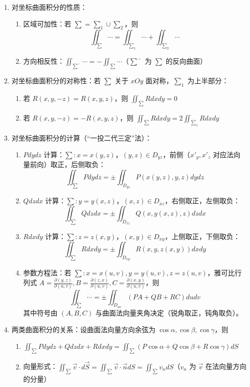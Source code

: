 \documentclass[UTF8]{ctexart}
\theoremstyle{remark}
\begin{document}
\begin{enumerate}
		\item 对坐标曲面积分的性质：
		\begin{enumerate}
			\item 区域可加性：若 \(\sum = \sum_1 \cup \sum_2\)，则 
			\[
			\iint_{\sum} \cdots = \iint_{\sum_1} \cdots + \iint_{\sum_2} \cdots
			\]
			\item 方向相反性：\(\iint_{\sum^-} \cdots = -\iint_{\sum} \cdots\)（\(\sum^-\) 为 \(\sum\) 的反向曲面）
		\end{enumerate}
		
		\item 对坐标曲面积分的对称性：若 \(\sum\) 关于 \(xOy\) 面对称，\(\sum_1\) 为上半部分：
		\begin{enumerate}
			\item 若 \(R(x, y, -z) = R(x, y, z)\)，则 \(\iint_{\sum} R dxdy = 0\)
			\item 若 \(R(x, y, -z) = -R(x, y, z)\)，则 \(\iint_{\sum} R dxdy = 2\iint_{\sum_1} R dxdy\)
		\end{enumerate}
		
		\item 对坐标曲面积分的计算（“一投二代三定”法）：
		\begin{enumerate}
			\item \(P dydz\) 计算：\(\sum: x = x(y, z)\)，\((y, z)\in D_{yz}\)，前侧（\(x'_y, x'_z\) 对应法向量前向）取正，后侧取负：
			\[
			\iint_{\sum} P dydz = \pm\iint_{D_{yz}} P(x(y, z), y, z) dydz
			\]
			\item \(Q dzdx\) 计算：\(\sum: y = y(x, z)\)，\((x, z)\in D_{xz}\)，右侧取正，左侧取负：
			\[
			\iint_{\sum} Q dzdx = \pm\iint_{D_{xz}} Q(x, y(x, z), z) dzdx
			\]
			\item \(R dxdy\) 计算：\(\sum: z = z(x, y)\)，\((x, y)\in D_{xy}\)，上侧取正，下侧取负：
			\[
			\iint_{\sum} R dxdy = \pm\iint_{D_{xy}} R(x, y, z(x, y)) dxdy
			\]
			\item 参数方程法：若 \(\sum: x=x(u,v),y=y(u,v),z=z(u,v)\)，雅可比行列式 \(A=\frac{\partial(y,z)}{\partial(u,v)}, B=\frac{\partial(z,x)}{\partial(u,v)}, C=\frac{\partial(x,y)}{\partial(u,v)}\)，则 
			\[
			\iint_{\sum} \cdots = \pm\iint_{D_{uv}} (PA + QB + RC) dudv
			\]
			其中符号由 \((A,B,C)\) 与曲面法向量夹角决定（锐角取正，钝角取负）。
		\end{enumerate}
		
		\item 两类曲面积分的关系：设曲面法向量方向余弦为 \(\cos\alpha,\cos\beta,\cos\gamma\)，则 
		\begin{enumerate}
			\item \(\iint_{\sum} P dydz + Q dzdx + R dxdy = \iint_{\sum} (P\cos\alpha + Q\cos\beta + R\cos\gamma) dS\)
			\item 向量形式：\(\iint_{\sum} \vec{v}\cdot d\vec{S} = \iint_{\sum} \vec{v}\cdot\vec{n} dS = \iint_{\sum} v_n dS\)（\(v_n\) 为 \(\vec{v}\) 在法向量方向的分量）
		\end{enumerate}
		

\end{enumerate}
\end{document}
